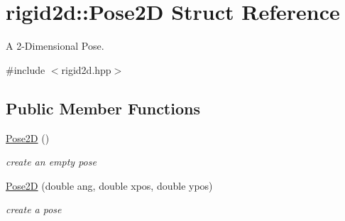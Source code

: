 \hypertarget{structrigid2d_1_1Pose2D}{}\section{rigid2d\+:\+:Pose2D Struct Reference}
\label{structrigid2d_1_1Pose2D}


A 2-\/\+Dimensional Pose.  




{\ttfamily \#include $<$rigid2d.\+hpp$>$}

\subsection*{Public Member Functions}
\begin{DoxyCompactItemize}
\item 
\mbox{\label{structrigid2d_1_1Pose2D_a88bf20c7ba06e18f9a8b01cef60e2c98}} 
\hyperlink{structrigid2d_1_1Pose2D_a88bf20c7ba06e18f9a8b01cef60e2c98}{Pose2D} ()
\begin{DoxyCompactList}\small\item\em create an empty pose \end{DoxyCompactList}\item 
\hyperlink{structrigid2d_1_1Pose2D_aec3600c75f7341955ba7e8881cdd101a}{Pose2D} (double ang, double xpos, double ypos)
\begin{DoxyCompactList}\small\item\em create a pose \end{DoxyCompactList}\end{DoxyCompactItemize}
